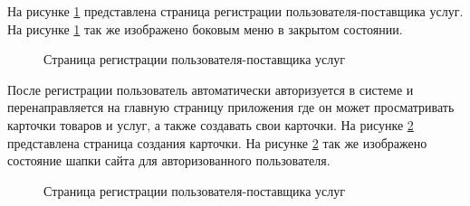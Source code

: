 На рисунке \ref{test-front2:image} представлена страница регистрации пользователя-поставщика услуг. На рисунке \ref{test-front2:image} так же изображено боковым меню в закрытом состоянии.

\newpage %
\begin{figure}[H] %
\caption{Страница регистрации пользователя-поставщика услуг}
\label{test-front2:image}
\end{figure}

После регистрации пользователь автоматически авторизуется в системе и перенаправляется на главную страницу приложения где он может просматривать карточки товаров и услуг, а также создавать свои карточки. На рисунке \ref{test-front3:image} представлена страница создания карточки. На рисунке \ref{test-front3:image} так же изображено состояние шапки сайта для авторизованного пользователя.

\newpage %
\begin{figure}[H] %
\caption{Страница регистрации пользователя-поставщика услуг}
\label{test-front3:image}
\end{figure}




